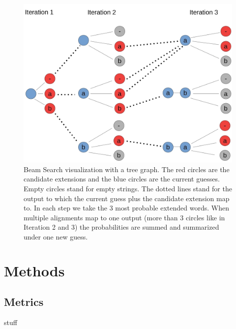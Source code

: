 \documentclass{article}
\begin{document}
\begin{figure}[H]
\begin{center}
\includegraphics[scale=0.2]{rsz_beam}
\end{center}
\caption{Beam Search visualization with a tree graph. The red circles are the candidate extensions and the blue circles are the current guesses. Empty circles stand for empty strings. The dotted lines stand for the output to which the current guess plus the candidate extension map to. In each step we take the 3 most probable extended words. When multiple alignments map to one output (more than 3 circles like in Iteration 2 and 3) the probabilities are summed and summarized under one new guess. }
\end{figure}  

\newpage
\section{Methods}

\subsection{Metrics}
stuff
\end{document}
